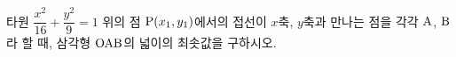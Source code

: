 타원 $\dfrac{x^2}{16}+\dfrac{y^2}{9}=1$ 위의 점 $\mathrm{P}(x_1{,}\mkern3mu\mathopen{}y_1)$에서의 접선이 $x$축, $y$축과 만나는 점을 각각 $\mathrm{A}$, $\mathrm{B}$라 할 때, 삼각형 $\mathrm{OAB}$의 넓이의 최솟값을 구하시오. 
